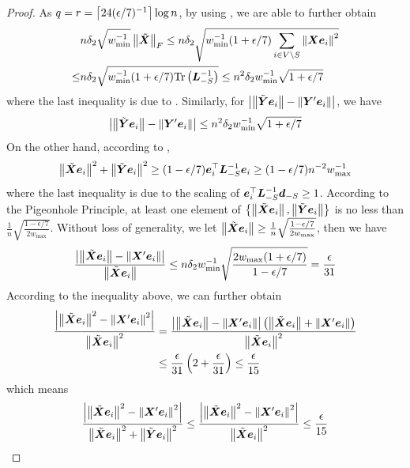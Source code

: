 \documentclass[sigconf]{acmart}
\begin{document}
\begin{proof}
    As \(q=r=\left\lceil24(\epsilon/7)^{-1}\right\rceil\log n\), by using , we are able to further obtain
    \begin{align*}
            & n\delta_2\sqrt{w_{\min}^{-1}}\left\Vert\tilde{\boldsymbol{X}}\right\Vert_F\le n\delta_2\sqrt{w_{\min}^{-1}(1+\epsilon/7)\sum_{i\in V\setminus S}\left\Vert\boldsymbol{X}\boldsymbol{e}_i\right\Vert^2} \\
        \le & n\delta_2\sqrt{w_{\min}^{-1}(1+\epsilon/7)\mathrm{Tr}\left(\boldsymbol{L}_{-S}^{-1}\right)}\le n^2\delta_2w_{\min}^{-1}\sqrt{1+\epsilon/7}
    \end{align*}
    where the last inequality is due to .
    Similarly, for \(\left|\left\Vert\tilde{\boldsymbol{Y}}\boldsymbol{e}_i\right\Vert-\left\Vert\boldsymbol{Y}'\boldsymbol{e}_i\right\Vert \right|\), we have
    \begin{equation}\label{eq:approx-maty-raw}
        \left|\left\Vert\tilde{\boldsymbol{Y}}\boldsymbol{e}_i\right\Vert-\left\Vert\boldsymbol{Y}'\boldsymbol{e}_i\right\Vert \right|\le n^2\delta_2w_{\min}^{-1}\sqrt{1+\epsilon/7}
    \end{equation}
    On the other hand, according to ,
    \[\left\Vert\tilde{\boldsymbol{X}}\boldsymbol{e}_i\right\Vert^2+\left\Vert\tilde{\boldsymbol{Y}}\boldsymbol{e}_i\right\Vert^2\ge(1-\epsilon/7)\boldsymbol{e}_i^\top\boldsymbol{L}_{-S}^{-1}\boldsymbol{e}_i\ge(1-\epsilon/7)n^{-2}w_{\max}^{-1}\]
    where the last inequality is due to the scaling of \(\boldsymbol{e}_i^\top\boldsymbol{L}_{-S}^{-1}\boldsymbol{d}_{-S}\ge1\).
    According to the Pigeonhole Principle, at least one element of \(\left\{\left\Vert\tilde{\boldsymbol{X}}\boldsymbol{e}_i\right\Vert,\left\Vert\tilde{\boldsymbol{Y}}\boldsymbol{e}_i\right\Vert \right\}\) is no less than \(\frac{1}{n}\sqrt{\frac{1-\epsilon/7}{2w_{\max}}}\).
    Without loss of generality, we let \(\left\Vert\tilde{\boldsymbol{X}}\boldsymbol{e}_i\right\Vert\ge\frac{1}{n}\sqrt{\frac{1-\epsilon/7}{2w_{\max}}}\), then we have
    \[\frac{\left|\left\Vert\tilde{\boldsymbol{X}}\boldsymbol{e}_i\right\Vert-\left\Vert\boldsymbol{X}'\boldsymbol{e}_i\right\Vert \right|}{\left\Vert\tilde{\boldsymbol{X}}\boldsymbol{e}_i\right\Vert}\le n\delta_2w_{\min}^{-1}\sqrt{\frac{2w_{\max}(1+\epsilon/7)}{1-\epsilon/7}}=\frac{\epsilon}{31}\]
    According to the inequality above, we can further obtain
    \begin{align*}
        \frac{\left|\left\Vert\tilde{\boldsymbol{X}}\boldsymbol{e}_i\right\Vert^2-\left\Vert\boldsymbol{X}'\boldsymbol{e}_i\right\Vert^2 \right|}{\left\Vert\tilde{\boldsymbol{X}}\boldsymbol{e}_i\right\Vert^2} & =\frac{\left|\left\Vert\tilde{\boldsymbol{X}}\boldsymbol{e}_i\right\Vert-\left\Vert\boldsymbol{X}'\boldsymbol{e}_i\right\Vert \right|\left( \left\Vert\tilde{\boldsymbol{X}}\boldsymbol{e}_i\right\Vert+\left\Vert\boldsymbol{X}'\boldsymbol{e}_i\right\Vert \right)}{\left\Vert\tilde{\boldsymbol{X}}\boldsymbol{e}_i\right\Vert^2} \\
                                                                                                      & \le\frac{\epsilon}{31}\left( 2+\frac{\epsilon}{31} \right)\le\frac{\epsilon}{15}
    \end{align*}
    which means
    \begin{equation}\label{eq:approx-matx}
        \frac{\abs{\Abs{\tilde{\matx}\vece_i}^2-\Abs{\matx'\vece_i}^2}}{\Abs{\tilde{\matx}\vece_i}^2+\Abs{\tilde{\maty}\vece_i}^2}\le\frac{\abs{\Abs{\tilde{\matx}\vece_i}^2-\Abs{\matx'\vece_i}^2}}{\Abs{\tilde{\matx}\vece_i}^2}\le\frac{\epsilon}{15}

\end{equation}
\end{proof}
\end{document}
